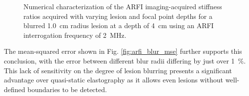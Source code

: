 			\begin{figure}[!htb]
				\centering
				\caption[Numerical characterization of ARFI imaging-acquired stiffness ratio with blurred lesions]{Numerical characterization of the ARFI imaging-acquired stiffness ratios acquired with varying lesion and focal point depths for a blurred \SI{1.0}{cm} radius lesion at a depth of \SI{4}{\cm} using an ARFI interrogation frequency of \SI{2}{\MHz}.}
				\label{fig:arfi_blur}
			\end{figure}

			The mean-squared error shown in Fig. \ref{fig:arfi_blur_mse} further supports this conclusion, with the error between different blur radii differing by just over \SI{1}{\percent}. This lack of sensitivity on the degree of lesion blurring presents a significant advantage over quasi-static elastography as it allows even lesions without well-defined boundaries to be detected.

